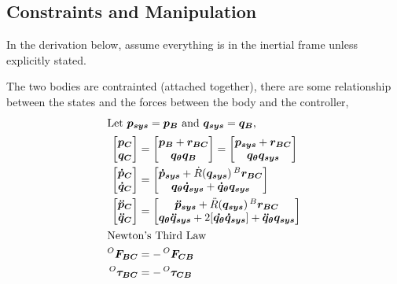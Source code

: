 \subsection{Constraints and Manipulation}
In the derivation below, assume everything is in the inertial frame unless explicitly stated. \par
The two bodies are contrainted (attached together), there are some relationship between the states and the forces between the body and the controller, 
\begin{align}
  \intertext{Let $\bm{p_{sys}} = \bm{p_B}$ and $\bm{q_{sys}} = \bm{q_{B}}$,}
  \begin{bmatrix}
    \bm{p_C} \\
    \bm{q_C}
  \end{bmatrix} &=
  \begin{bmatrix}
    \bm{p_B} + \bm{r_{BC}} \\
    \bm{q_{\theta}}\bm{q_B}
  \end{bmatrix}
  =
  \begin{bmatrix}
    \bm{p_{sys}} + \bm{r_{BC}} \\
    \bm{q_{\theta}}\bm{q_{sys}}
\end{bmatrix}  \\
  \begin{bmatrix}
    \bm{\dot{p}_C} \\
    \bm{\dot{q}_C}
  \end{bmatrix} &=
  \begin{bmatrix}
    \bm{\dot{p}_{sys}} + \dot{R}(\bm{q_{sys}})\prescript{B}{}{\bm{r_{BC}}} \\
    \bm{q_{\theta}}\bm{\dot{q}_{sys}} + \bm{\dot{q}_{\theta}}\bm{q_{sys}} 
\end{bmatrix} \\
  \begin{bmatrix}
    \bm{\ddot{p}_C} \\
    \bm{\ddot{q}_C}
  \end{bmatrix} &=
  \begin{bmatrix}
    \bm{\ddot{p}_{sys}} + \ddot{R}(\bm{q_{sys}})\prescript{B}{}{\bm{r_{BC}}} \\
    \bm{q_{\theta}}\bm{\ddot{q}_{sys}} + 2[\bm{\dot{q_\theta}} \bm{\dot{q}_{sys}}] + \bm{\ddot{q}_{\theta}}\bm{q_{sys}} 
  \end{bmatrix} \\   
  \intertext{Newton's Third Law}
  \prescript{O}{}{\bm{F_{BC}}} &= -\prescript{O}{}{\bm{F_{CB}}} \\
  \prescript{O}{}{\bm{\tau_{BC}}} &= -\prescript{O}{}{\bm{\tau_{CB}}}
\end{align}

